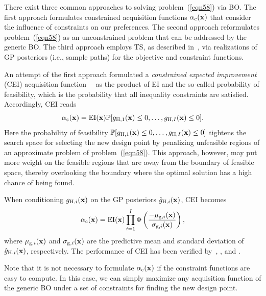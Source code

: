\documentclass[journal ]{new-aiaa}
\begin{document}
There exist three common approaches to solving problem~(\ref{eqn58}) via BO.
The first approach formulates constrained acquisition functions $\alpha_\text{c}({\bf x})$ that consider the influence of constraints on our preferences.
The second approach reformulates problem~(\ref{eqn58}) as an unconstrained problem that can be addressed by the generic BO.
The third approach employs TS, as described in~, via realizations of GP posteriors (i.e., sample paths) for the objective and constraint functions.    

An attempt of the first approach formulated a \textit{constrained expected improvement} (CEI) acquisition function~~\citep{Schonlau1998} as the product of EI and the so-called probability of feasibility, which is the probability that all inequality constraints are satisfied.
Accordingly, CEI reads
\begin{equation}\label{eqn59}
	\alpha_\text{c}({\bf x}) = \text{EI}({\bf x}) \mathbb{P}[g_{\text{H},1}({\bf x}) \leq 0,\dots,g_{\text{H},I}({\bf x}) \leq 0].
\end{equation}
Here the probability of feasibility $\mathbb{P}[g_{\text{H},1}({\bf x}) \leq 0,\dots,g_{\text{H},I}({\bf x}) \leq 0]$ tightens the search space for selecting the new design point by penalizing unfeasible regions of an approximate problem of problem~(\ref{eqn58}).
This approach, however, may put more weight on the feasible regions that are away from the boundary of feasible space, thereby overlooking the boundary where the optimal solution has a high chance of being found.

When conditioning $g_{\text{H},i}({\bf x})$ on the GP posteriors $\hat{g}_{\text{H},i}({\bf x})$, CEI becomes
\begin{equation}\label{eqn60}
	\alpha_\text{c}({\bf x}) = \text{EI}({\bf x}) \prod_{i=1}^I\Phi\left(\frac{-\mu_{\text{g},i}({\bf x})}{\sigma_{\text{g},i}({\bf x})}\right),
\end{equation}
where $\mu_{\text{g},i}({\bf x})$ and $\sigma_{\text{g},i}({\bf x})$ are the predictive mean and standard deviation of $\hat{g}_{\text{H},i}({\bf x})$, respectively.
The performance of CEI has been verified by~\citet{Gardner2014}, \citet{Sobester2014}, and \citet{Kontogiannis2020b}.

Note that it is not necessary to formulate $\alpha_\text{c}({\bf x})$ if the constraint functions are easy to compute.
In this case, we can simply maximize any acquisition function of the generic BO under a set of constraints for finding the new design point.
\end{document}

